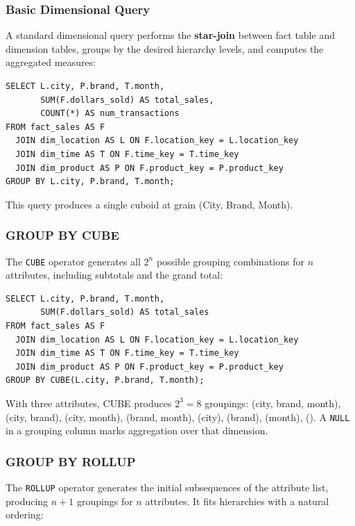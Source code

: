 \subsubsection{Basic Dimensional Query}
\label{subsec:basic-dimensional-query}

A standard dimensional query performs the \textbf{star-join} between fact table and dimension tables, groups by the desired hierarchy levels, and computes the aggregated measures:

\begin{lstlisting}
SELECT L.city, P.brand, T.month,
       SUM(F.dollars_sold) AS total_sales,
       COUNT(*) AS num_transactions
FROM fact_sales AS F
  JOIN dim_location AS L ON F.location_key = L.location_key
  JOIN dim_time AS T ON F.time_key = T.time_key
  JOIN dim_product AS P ON F.product_key = P.product_key
GROUP BY L.city, P.brand, T.month;
\end{lstlisting}

This query produces a single cuboid at grain (City, Brand, Month).

\subsubsection{GROUP BY CUBE}
\label{subsec:group-by-cube}

The \texttt{CUBE} operator generates all $2^n$ possible grouping combinations for $n$ attributes, including subtotals and the grand total:

\begin{lstlisting}
SELECT L.city, P.brand, T.month,
       SUM(F.dollars_sold) AS total_sales
FROM fact_sales AS F
  JOIN dim_location AS L ON F.location_key = L.location_key
  JOIN dim_time AS T ON F.time_key = T.time_key
  JOIN dim_product AS P ON F.product_key = P.product_key
GROUP BY CUBE(L.city, P.brand, T.month);
\end{lstlisting}

With three attributes, CUBE produces $2^3 = 8$ groupings: (city, brand, month), (city, brand), (city, month), (brand, month), (city), (brand), (month), (). A \texttt{NULL} in a grouping column marks aggregation over that dimension.

\subsubsection{GROUP BY ROLLUP}
\label{subsec:group-by-rollup}

The \texttt{ROLLUP} operator generates the initial subsequences of the attribute list, producing $n+1$ groupings for $n$ attributes. It fits hierarchies with a natural ordering:

